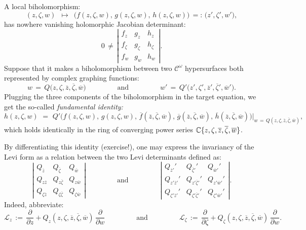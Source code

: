 \documentclass[12pt,twoside,leqno,openany]{amsart}
\begin{document}
A local biholomorphism:
\[
(z,\zeta,w)
\,\,\,\longmapsto\,\,\,
\Big(f(z,\zeta,w),\,
g(z,\zeta,w),\,
h(z,\zeta,w)\Big)
\,=:\,
\big(z',\zeta',w'\big),
\]
has nowhere vanishing holomorphic Jacobian determinant:
\[
0
\,\neq\,
\left\vert\!
\begin{array}{ccc}
f_z & g_z & h_z
\\
f_\zeta & g_\zeta & h_\zeta
\\
f_w & g_w & h_w
\end{array}
\!\right\vert.
\]
Suppose that it makes a biholomorphism
between two $\mathcal{C}^\omega$ hypersurfaces
both represented by complex graphing functions:
\[
w
\,=\,
Q\big(z,\zeta,\overline{z},\overline{\zeta},\overline{w}\big)
\ \ \ \ \ \ \ \ \ \ \ \ \ \ \ \ \ \ \ \
\text{and}
\ \ \ \ \ \ \ \ \ \ \ \ \ \ \ \ \ \ \ \
w'
\,=\,
Q'\big(
z',\zeta',\overline{z}',\overline{\zeta}',\overline{w}'
\big).
\]
Plugging the three components of the 
biholomorphism in the target equation,
we get the so-called {\sl fundamental identity:}
\[
h(z,\zeta,w)
\,\,=\,\,
Q'
\Big(
f(z,\zeta,w),\,
g(z,\zeta,w),\,
\overline{f}(\overline{z},\overline{\zeta},\overline{w}),\,
\overline{g}(\overline{z},\overline{\zeta},\overline{w}),\,
\overline{h}(\overline{z},\overline{\zeta},\overline{w})
\Big)
\bigg\vert_{
w\,=\,Q(z,\zeta,\overline{z},\overline{\zeta},\overline{w})},
\]
which holds
identically in the ring of
converging power series $\mathbb{C}\{z, \zeta, \overline{z}, 
\overline{\zeta}, \overline{w} \}$.

By differentiating this identity (exercise!), 
one may express the invariancy of the Levi
form as a relation between the two Levi determinants
defined as:
\[
\left\vert\!
\begin{array}{ccc}
Q_{\overline{z}} & Q_{\overline{\zeta}} 
& 
Q_{\overline{w}}
\\
Q_{z\overline{z}} & Q_{z\overline{\zeta}} 
& 
Q_{z\overline{w}}
\\
Q_{\zeta\overline{z}} & Q_{\zeta\overline{\zeta}} 
& 
Q_{\zeta\overline{w}}
\end{array}
\!\right\vert
\ \ \ \ \ \ \ \ \ \ \ \ \ \ \ \ \ \ \ \
\text{and}
\ \ \ \ \ \ \ \ \ \ \ \ \ \ \ \ \ \ \ \
\left\vert\!
\begin{array}{ccc}
Q_{\overline{z}'}' & Q_{\overline{\zeta}'}' 
& 
Q_{\overline{w}'}'
\\
Q_{z'\overline{z}'}' & Q_{z'\overline{\zeta}'}'
& 
Q_{z'\overline{w}'}'
\\
Q_{\zeta'\overline{z}'}' & Q_{\zeta'\overline{\zeta}'}'
& 
Q_{\zeta'\overline{w}'}'
\end{array}
\!\right\vert.
\]
Indeed, abbreviate:
\[
\mathcal{L}_z
\,:=\,
\frac{\partial}{\partial z}
+
Q_z(z,\zeta,\overline{z},\overline{\zeta},\overline{w})\,
\frac{\partial}{\partial w}
\ \ \ \ \ \ \ \ \ \ \ \ \ \ \ \ \ \ \ \
\text{and}
\ \ \ \ \ \ \ \ \ \ \ \ \ \ \ \ \ \ \ \
\mathcal{L}_\zeta
\,:=\,
\frac{\partial}{\partial\zeta}
+
Q_\zeta(z,\zeta,\overline{z},\overline{\zeta},\overline{w})\,
\frac{\partial}{\partial w}.
\]
\end{document}
